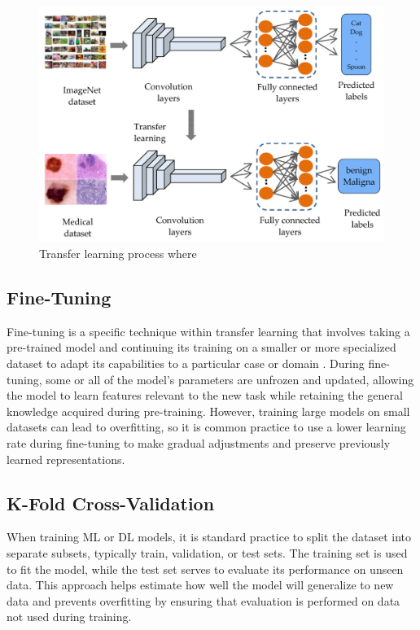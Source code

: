\documentclass[a4paper,10pt]{book}
\begin{document}
\begin{figure}[h!]
    \centering
    \includegraphics[width=0.75\linewidth]{reports//assets/transfer-learning.png}
    \caption[Transfer learning process]{Transfer learning process where}
    \label{fig:transfer_learning}
\end{figure}


\subsection{Fine-Tuning}

Fine-tuning is a specific technique within transfer learning that involves taking a pre-trained model and continuing its training on a smaller or more specialized dataset to adapt its capabilities to a particular case or domain \cite{noauthor_what_2024}. During fine-tuning, some or all of the model’s parameters are unfrozen and updated, allowing the model to learn features relevant to the new task while retaining the general knowledge acquired during pre-training. However, training large models on small datasets can lead to overfitting, so it is common practice to use a lower learning rate during fine-tuning to make gradual adjustments and preserve previously learned representations.

\subsection{K-Fold Cross-Validation}

When training ML or DL models, it is standard practice to split the dataset into separate subsets, typically train, validation, or test sets. The training set is used to fit the model, while the test set serves to evaluate its performance on unseen data. This approach helps estimate how well the model will generalize to new data and prevents overfitting by ensuring that evaluation is performed on data not used during training.
\end{document}
